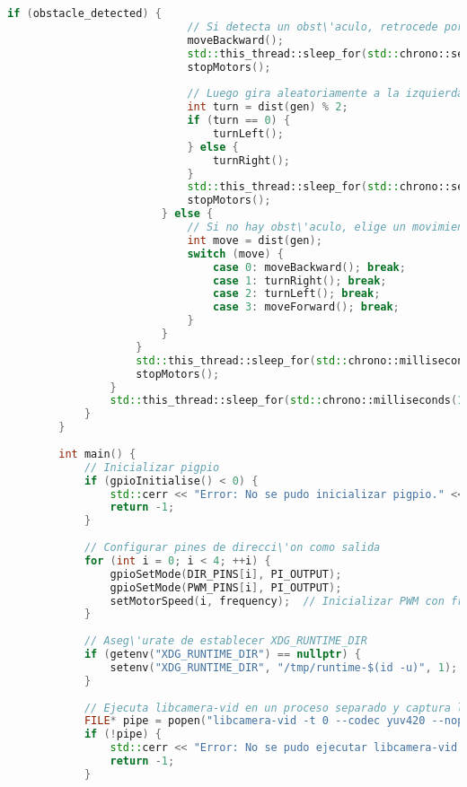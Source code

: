 \begin{lstlisting}[language={C++}, caption={Primera versi\'on del c\'odigo del sistema de control del robot}, label={PrimeraVersionCodigoRobot}]
                        if (obstacle_detected) {
                            // Si detecta un obst\'aculo, retrocede por 4 segundos
                            moveBackward();
                            std::this_thread::sleep_for(std::chrono::seconds(4));
                            stopMotors();
        
                            // Luego gira aleatoriamente a la izquierda o derecha
                            int turn = dist(gen) % 2;
                            if (turn == 0) {
                                turnLeft();
                            } else {
                                turnRight();
                            }
                            std::this_thread::sleep_for(std::chrono::seconds(2));
                            stopMotors();
                        } else {
                            // Si no hay obst\'aculo, elige un movimiento aleatorio
                            int move = dist(gen);
                            switch (move) {
                                case 0: moveBackward(); break;
                                case 1: turnRight(); break;
                                case 2: turnLeft(); break;
                                case 3: moveForward(); break;
                            }
                        }
                    }
                    std::this_thread::sleep_for(std::chrono::milliseconds(500));
                    stopMotors();
                }
                std::this_thread::sleep_for(std::chrono::milliseconds(100));
            }
        }
        
        int main() {
            // Inicializar pigpio
            if (gpioInitialise() < 0) {
                std::cerr << "Error: No se pudo inicializar pigpio." << std::endl;
                return -1;
            }
        
            // Configurar pines de direcci\'on como salida
            for (int i = 0; i < 4; ++i) {
                gpioSetMode(DIR_PINS[i], PI_OUTPUT);
                gpioSetMode(PWM_PINS[i], PI_OUTPUT);
                setMotorSpeed(i, frequency);  // Inicializar PWM con frecuencia inicial
            }
        
            // Aseg\'urate de establecer XDG_RUNTIME_DIR
            if (getenv("XDG_RUNTIME_DIR") == nullptr) {
                setenv("XDG_RUNTIME_DIR", "/tmp/runtime-$(id -u)", 1);
            }
        
            // Ejecuta libcamera-vid en un proceso separado y captura la salida en YUV, sin previsualizaci\'on
            FILE* pipe = popen("libcamera-vid -t 0 --codec yuv420 --nopreview -o -", "r");
            if (!pipe) {
                std::cerr << "Error: No se pudo ejecutar libcamera-vid." << std::endl;
                return -1;
            }
        

\end{lstlisting}
